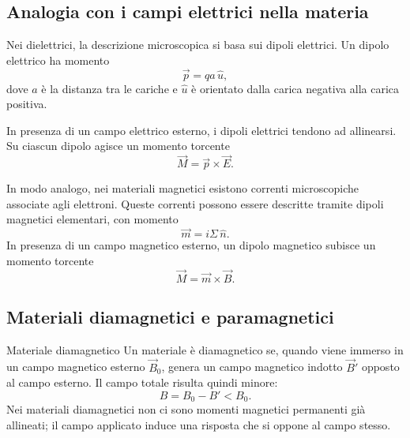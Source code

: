 \documentclass[a4paper]{article}
\begin{document}
\subsection{Analogia con i campi elettrici nella materia}

Nei dielettrici, la descrizione microscopica si basa sui dipoli elettrici. Un dipolo elettrico ha momento
\[
\vec{p}=qa\,\hat{u},
\]
dove \(a\) è la distanza tra le cariche e \(\hat{u}\) è orientato dalla carica negativa alla carica positiva.

In presenza di un campo elettrico esterno, i dipoli elettrici tendono ad allinearsi. Su ciascun dipolo agisce un momento torcente
\[
\vec{M}=\vec{p}\times\vec{E}.
\]

In modo analogo, nei materiali magnetici esistono correnti microscopiche associate agli elettroni. Queste correnti possono essere descritte tramite dipoli magnetici elementari, con momento
\[
\vec{m}=i\Sigma\,\hat{n}.
\]
In presenza di un campo magnetico esterno, un dipolo magnetico subisce un momento torcente
\[
\vec{M}=\vec{m}\times\vec{B}.
\]

\subsection{Materiali diamagnetici e paramagnetici}

\begin{snippetdefinition}{Materiale diamagnetico}
Un materiale è diamagnetico se, quando viene immerso in un campo magnetico esterno \(\vec{B}_0\), genera un campo magnetico indotto \(\vec{B}'\) opposto al campo esterno. Il campo totale risulta quindi minore:
\[
    B=B_0-B'<B_0.
\]
Nei materiali diamagnetici non ci sono momenti magnetici permanenti già allineati; il campo applicato induce una risposta che si oppone al campo stesso.
\end{snippetdefinition}

\begin{center}
\end{center}
\end{document}
